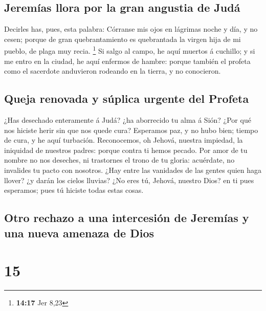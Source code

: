 \hypertarget{jeremuxedas-llora-por-la-gran-angustia-de-juduxe1}{%
\subsection{Jeremías llora por la gran angustia de
Judá}\label{jeremuxedas-llora-por-la-gran-angustia-de-juduxe1}}

 Decirles has, pues, esta palabra: Córranse mis ojos en
lágrimas noche y día, y no cesen; porque de gran quebrantamiento es
quebrantada la virgen hija de mi pueblo, de plaga muy recia. \footnote{\textbf{14:17}
  Jer 8,23}  Si salgo al campo, he aquí muertos á
cuchillo; y si me entro en la ciudad, he aquí enfermos de hambre: porque
también el profeta como el sacerdote anduvieron rodeando en la tierra, y
no conocieron.

\hypertarget{queja-renovada-y-suxfaplica-urgente-del-profeta}{%
\subsection{Queja renovada y súplica urgente del
Profeta}\label{queja-renovada-y-suxfaplica-urgente-del-profeta}}

 ¿Has desechado enteramente á Judá? ¿ha aborrecido tu
alma á Sión? ¿Por qué nos hiciste herir sin que nos quede cura?
Esperamos paz, y no hubo bien; tiempo de cura, y he aquí turbación.
 Reconocemos, oh Jehová, nuestra impiedad, la iniquidad
de nuestros padres: porque contra ti hemos pecado.  Por
amor de tu nombre no nos deseches, ni trastornes el trono de tu gloria:
acuérdate, no invalides tu pacto con nosotros.  ¿Hay
entre las vanidades de las gentes quien haga llover? ¿y darán los cielos
lluvias? ¿No eres tú, Jehová, nuestro Dios? en ti pues esperamos; pues
tú hiciste todas estas cosas.

\hypertarget{otro-rechazo-a-una-intercesiuxf3n-de-jeremuxedas-y-una-nueva-amenaza-de-dios}{%
\subsection{Otro rechazo a una intercesión de Jeremías y una nueva
amenaza de
Dios}\label{otro-rechazo-a-una-intercesiuxf3n-de-jeremuxedas-y-una-nueva-amenaza-de-dios}}

\hypertarget{section-14}{%
\section{15}\label{section-14}}

